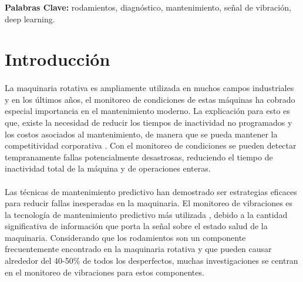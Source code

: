 \documentclass[12pt]{article}%
\begin{document}
\noindent
\textbf{Palabras Clave:} rodamientos, diagnóstico, mantenimiento, señal de vibración, deep learning.


\newpage
\renewcommand{\contentsname}{Índice}
\tableofcontents
\renewcommand{\figurename}{Figura}
\renewcommand{\refname}{Referencias}
\renewcommand{\listtablename}{Lista de Tablas}
\newpage



\renewcommand{\listfigurename}{Lista de Figuras}
\listoffigures
\listoftables
\newpage


\section{Introducción}

\paragraph{}
La maquinaria rotativa es ampliamente utilizada en muchos campos industriales y en los últimos años, el monitoreo de condiciones de estas máquinas ha cobrado especial importancia en el mantenimiento moderno. La explicación para esto es que, existe la necesidad de reducir los tiempos de inactividad no programados y los costos asociados al mantenimiento, de manera que se pueda mantener la competitividad corporativa \cite{seeraa}. Con el monitoreo de condiciones se pueden detectar tempranamente fallas potencialmente desastrosas, reduciendo el tiempo de inactividad total de la máquina y de operaciones enteras.

\paragraph{}
Las técnicas de mantenimiento predictivo han demostrado ser estrategias eficaces para reducir fallas inesperadas en la maquinaria. El monitoreo de vibraciones es la tecnología de mantenimiento predictivo más utilizada \cite{zhan}, debido a la cantidad significativa de información que porta la señal sobre el estado salud de la maquinaria. Considerando que los rodamientos son un componente frecuentemente encontrado en la maquinaria rotativa y que pueden causar alrededor del 40-50\% \cite{issam} de todos los desperfectos, muchas investigaciones se centran en el monitoreo de vibraciones para estos componentes.
\end{document}
